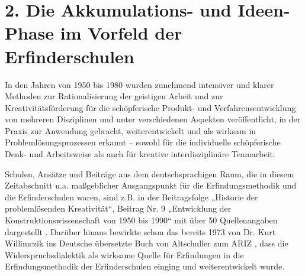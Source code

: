 \documentclass[11pt,a4paper]{article}
\begin{document}
\section*{2. Die Akkumulations- und Ideen-Phase im Vorfeld der
  Erfinderschulen} 
 
In den Jahren von 1950 bis 1980 wurden zunehmend intensiver und klarer
Methoden zur Rationalisierung der geistigen Arbeit und zur
Kreativitätsförderung für die schöpferische Produkt- und Verfahrensentwicklung
von mehreren Disziplinen und unter verschiedenen Aspekten ver\-öffent\-licht,
in der Praxis zur Anwendung gebracht, weiterentwickelt und als wirksam in
Problem\-lösungs\-prozessen erkannt -- sowohl für die individuelle
schöpferische Denk- und Arbeitsweise als auch für kreative interdisziplinäre
Teamarbeit.

Schulen, Ansätze und Beiträge aus dem deutschsprachigen Raum, die in diesem
Zeitabschnitt u.a. maßgeblicher Ausgangspunkt für die Erfindungsmethodik und
die Erfinderschulen waren, sind z.B. in der Beitragsfolge „Historie der
problemlösenden Kreativität“, Beitrag Nr. 9 „Entwicklung der
Konstruktionswissenschaft von 1950 bis 1990“ mit über 50 Quellenangaben
dargestellt \cite{1}. Darüber hinaus bewirkte schon das bereits 1973 von
Dr. Kurt Willimczik ins Deutsche übersetzte Buch von Altschuller zum ARIZ
\cite{3.1}, dass die Widerspruchsdialektik als wirksame Quelle für Erfindungen
in die Erfindungsmethodik der Erfinderschulen einging und weiterentwickelt
wurde.
\end{document}
